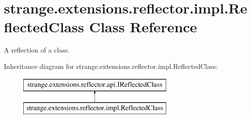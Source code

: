 \hypertarget{classstrange_1_1extensions_1_1reflector_1_1impl_1_1_reflected_class}{\section{strange.\-extensions.\-reflector.\-impl.\-Reflected\-Class Class Reference}
\label{classstrange_1_1extensions_1_1reflector_1_1impl_1_1_reflected_class}
}


A reflection of a class.  


Inheritance diagram for strange.\-extensions.\-reflector.\-impl.\-Reflected\-Class\-:\begin{figure}[H]
\begin{center}
\leavevmode
\includegraphics[height=2.000000cm]{classstrange_1_1extensions_1_1reflector_1_1impl_1_1_reflected_class}
\end{center}
\end{figure}
